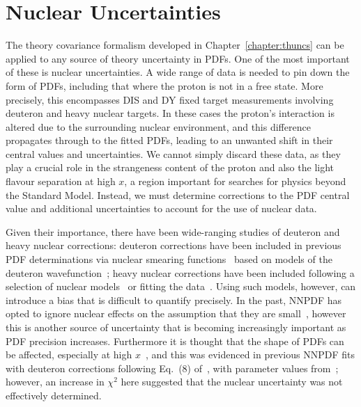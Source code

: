 \chapter{Nuclear Uncertainties}
\label{chapter:nuclear}
The theory covariance formalism developed in Chapter~\ref{chapter:thuncs} can be applied to any source of theory uncertainty in PDFs. One of the most important of these is nuclear uncertainties. A wide range of data is needed to pin down the form of PDFs, including that where the proton is not in a free state. More precisely, this encompasses DIS and DY fixed target measurements involving deuteron and heavy nuclear targets. In these cases the proton's interaction is altered due to the surrounding nuclear environment, and this difference propagates through to the fitted PDFs, leading to an unwanted shift in their central values and uncertainties. We cannot simply discard these data, as they play a crucial role in the strangeness content of the proton and also the light flavour separation at high $x$, a region important for searches for physics beyond the Standard Model. Instead, we must determine corrections to the PDF central value and additional uncertainties to account for the use of nuclear data.

Given their importance, there have been wide-ranging studies of deuteron and heavy nuclear corrections: deuteron corrections have been included in previous PDF determinations via nuclear smearing functions~\cite{Owens:2012bv,Ball:2013gsa,Harland-Lang:2014zoa,Accardi:2016qay,
  Alekhin:2017fpf} based on models of the deuteron wavefunction~\cite{Wiringa:1994wb,Melnitchouk:1994rv,Melnitchouk:1996vp,
  Machleidt:2000ge,Gross:2014wqa}; heavy nuclear corrections have been included following a selection of nuclear models~\cite{Harland-Lang:2014zoa,Dulat:2015mca,Alekhin:2017kpj} or fitting the data~\cite{Accardi:2016qay}. Using such models, however, can introduce a bias that is difficult to quantify precisely. In the past, NNPDF has opted to ignore nuclear effects on the assumption that they are small~\cite{Ball:2013gsa, Ball:2014uwa, Ball:2017nwa}, however this is another source of uncertainty that is becoming increasingly important as PDF precision increases. Furthermore it is thought that the shape of PDFs can be affected, especially at high $x$~\cite{Owens:2012bv}, and this was evidenced in previous NNPDF fits with deuteron corrections following Eq.~(8) of~\cite{Harland-Lang:2014zoa}, with parameter values
from~\cite{Martin:2012da}; however, an increase in $\chi^2$ here suggested that the nuclear uncertainty was not effectively determined.
  
